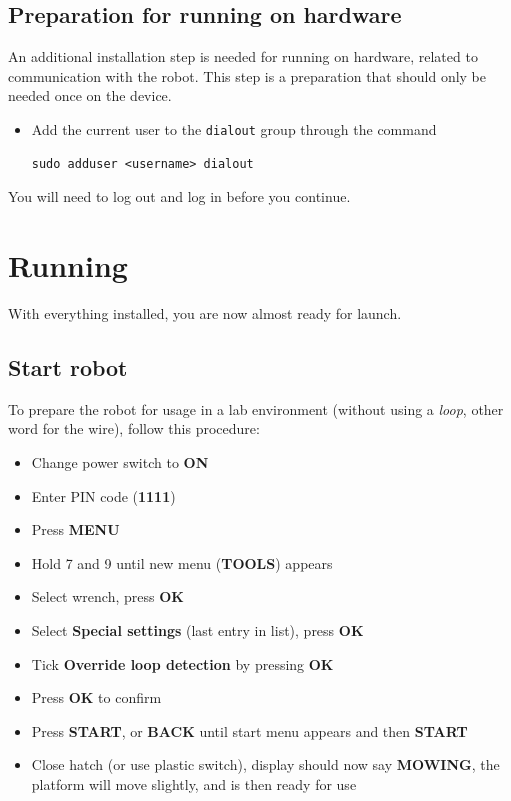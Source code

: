 \documentclass[]{article}
\begin{document}
\subsection{Preparation for running on hardware}\label{sec:install_hardware}
An additional installation step is needed for running on hardware, related to communication with the robot. This step is a preparation that should only be needed once on the device.
\begin{itemize}
\item Add the current user to the \verb|dialout| group through the command
\begin{verbatim}
sudo adduser <username> dialout
\end{verbatim}
\end{itemize}
You will need to log out and log in before you continue.

\section{Running}\label{sec:run}
With everything installed, you are now almost ready for launch.

\subsection{Start robot}\label{sec:run_robot}
To prepare the robot for usage in a lab environment (without using a \textit{loop}, other word for the wire), follow this procedure:
\begin{itemize}
\item Change power switch to \textbf{ON}
\item Enter PIN code (\textbf{1111})
\item Press \textbf{MENU}
\item Hold 7 and 9 until new menu (\textbf{TOOLS}) appears
\item Select wrench, press \textbf{OK}
\item Select \textbf{Special settings} (last entry in list), press \textbf{OK}
\item Tick \textbf{Override loop detection} by pressing \textbf{OK}
\item Press \textbf{OK} to confirm
\item Press \textbf{START}, or \textbf{BACK} until start menu appears and then \textbf{START}
\item Close hatch (or use plastic switch), display should now say \textbf{MOWING}, the platform will move slightly, and is then ready for use
\end{itemize}
\end{document}
